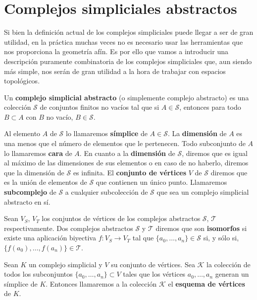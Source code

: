 \section{Complejos simpliciales abstractos}

Si bien la definición actual de los complejos simpliciales puede llegar a ser de gran utilidad, en 
la práctica muchas veces no es necesario usar las herramientas que nos proporciona la geometría afín. 
Es por ello que vamos a introducir una descripción puramente combinatoria de los complejos simpliciales 
que, aun siendo más simple, nos serán de gran utilidad a la hora de trabajar con espacios topológicos.

\begin{definicion}
	Un \textbf{complejo simplicial abstracto} (o simplemente complejo abstracto) es una 
	colección $\mathcal{S}$ de conjuntos finitos no vacíos tal que si $A \in \mathcal{S}$, 
	entonces para todo $B \subset A$ con $B$ no vacío, $B \in \mathcal{S}$.
\end{definicion}

Al elemento $A$ de $\mathcal{S}$ lo llamaremos \textbf{símplice} de $A \in \mathcal{S}$. La 
\textbf{dimensión} de $A$ es una menos que el número de elementos que le pertenecen. Todo 
subconjunto de $A$ lo llamaremos \textbf{cara} de $A$. En cuanto a la \textbf{dimensión} de 
$\mathcal{S}$, diremos que es igual al máximo de las dimensiones de sus elementos o en caso de 
no haberlo, diremos que la dimensión de $\mathcal{S}$ es infinita. El \textbf{conjunto de vértices} 
$V$ de $\mathcal{S}$ diremos que es la unión de elementos de $\mathcal{S}$ que contienen un único punto. 
Llamaremos \textbf{subcomplejo} de $\mathcal{S}$ a cualquier subcolección de $\mathcal{S}$ que sea 
un complejo simplicial abstracto en sí.

Sean $V_S$, $V_T$ los conjuntos de vértices de los complejos abstractos $\mathcal{S}$, $\mathcal{T}$  respectivamente. Dos complejos abstractos $\mathcal{S}$ y $\mathcal{T}$ diremos que son 
\textbf{isomorfos} si existe una aplicación biyectiva $f: V_S \rightarrow V_T$ tal que 
$\{a_0, \dots, a_n\} \in \mathcal{S}$ si, y sólo si, $\{f(a_0), \dots, f(a_n)\} \in \mathcal{T}$.

\begin{definicion}
	Sean $K$ un complejo simplicial y $V$ su conjunto de vértices. Sea $\mathcal{K}$ la colección de 
	todos los subconjuntos $\{a_0, \dots, a_n\} \subset V$ tales que los vértices $a_0, \dots, a_n$ 
	generan un símplice de $K$. Entonces llamaremos a la colección $\mathcal{K}$ el 
	\textbf{esquema de vértices} de $K$.
\end{definicion}

